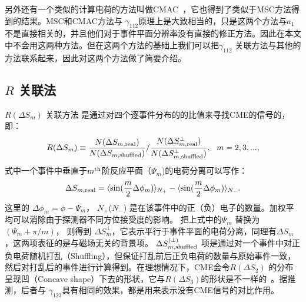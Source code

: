 另外还有一个类似的计算电荷的方法叫做CMAC~\cite{STAR4}，它也得到了类似于MSC方法得到的结果。MSC和CMAC方法与 $\gamma_{112}$原理上是大致相当的，只是这两个方法与$a_1$ 不是直接相关的，并且他们对于事件平面分辨率没有直接的修正方法。因此在本文中不会用这两种方法。但在这两个方法的基础上我们可以把$\gamma_{112}$ 关联方法与其他的方法联系起来，因此对这两个方法做了简要介绍。

\subsection{$R$ 关联法}
$R(\Delta S_m)$ 关联方法\cite{RCorr-2011,RCorr-2018} 是通过对四个逐事件分布的的比值来寻找CME的信号的，即：
\begin{equation}
R(\Delta S_m) \equiv \frac{N(\Delta S_{m,\rm real})}{N(\Delta S_{m,\rm shuffled})} / \frac{N(\Delta S^{\perp}_{m,\rm real})}{N(\Delta S^{\perp}_{m,\rm shuffled})}, ~\ m = 2,3,...,
\end{equation}
式中一个事件中垂直于$m^{\rm th}$阶反应平面（$\Psi_m$)的电荷分离可以写作：
\begin{equation}
\Delta S_{m,\rm real} = \langle\sin(\frac{m}{2}\Delta\phi_m)\rangle_{N_+} - \langle\sin(\frac{m}{2}\Delta\phi_m)\rangle_{N_-}.   
\end{equation}
这里的 $\Delta\phi_m = \phi - \Psi_m$， $N_+$($N_-$) 是在该事件中的正（负）电子的数量。加权平均可以消除由于探测器不同方位接受度的影响。 把上式中的$\Psi_m$ 替换为$( \Psi_m + \pi/m)$， 则得到 $\Delta S^{\perp}_m$，它表示平行于事件平面的电荷分离，同理有$\Delta S_m$，这两项表征的是与磁场无关的背景项。
$\Delta S^{(\perp)}_{m,\rm shuffled}$ 项是通过对一个事件中对正负电荷随机打乱（Shuffling），但保证打乱前后正负电荷的数量与原始事件一致，然后对打乱后的事件进行计算得到。在理想情况下，CME会令$R(\Delta S_2)$ 的分布呈现凹（Concave shape）下去的形状，它与$R(\Delta S_3)$的形状是不一样的~\cite{RCorr-2018}。据推测，后者与 $\gamma_{123}$具有相同的效果，都是用来表示没有CME信号的对比作用。

